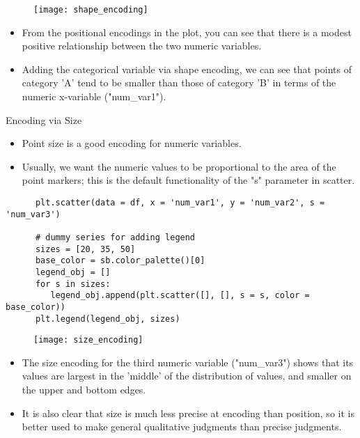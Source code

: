 \documentclass[12pt]{beamer}
\begin{document}
    \begin{frame}{}
    	
    	\begin{figure}
    		\centering
    		\texttt{[image: shape\_encoding]}
    	\end{figure}
        \begin{itemize}
    		\item From the positional encodings in the plot, you can see that there is a modest positive relationship between the two numeric variables.
    		\item Adding the categorical variable via shape encoding, we can see that points of category 'A' tend to be smaller than those of category 'B' in terms of the numeric x-variable ("num\_var1").
    	\end{itemize}
    \end{frame}
    \begin{frame}[fragile]{Encoding via Size}
    	\begin{itemize}
    		\item Point size is a good encoding for numeric variables.
    		\item Usually, we want the numeric values to be proportional to the area of the point markers; this is the default functionality of the "s" parameter in scatter. 
    	\end{itemize}
        \vspace{0.4cm}
        \fontsize{8}{0.5}
        \begin{verbatim}
      plt.scatter(data = df, x = 'num_var1', y = 'num_var2', s = 'num_var3')

      # dummy series for adding legend
      sizes = [20, 35, 50]
      base_color = sb.color_palette()[0]
      legend_obj = []
      for s in sizes:
         legend_obj.append(plt.scatter([], [], s = s, color = base_color))
      plt.legend(legend_obj, sizes)
        \end{verbatim}
    \end{frame}
    \begin{frame}{}
    	\begin{figure}
    		\centering
    		\texttt{[image: size\_encoding]}
    	\end{figure}
    	\begin{itemize}
    		\item The size encoding for the third numeric variable ("num\_var3") shows that its values are largest in the 'middle' of the distribution of values, and smaller on the upper and bottom edges.
    		\item  It is also clear that size is much less precise at encoding than position, so it is better used to make general qualitative judgments than precise judgments.
    	\end{itemize}
    \end{frame}
\end{document}
